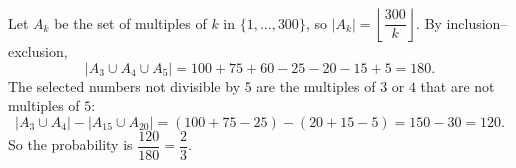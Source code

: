 Let $A_k$ be the set of multiples of $k$ in $\{1,\dots,300\}$, so $|A_k|=\left\lfloor\dfrac{300}{k}\right\rfloor$. By inclusion--exclusion,
\[
|A_3\cup A_4\cup A_5|=100+75+60-25-20-15+5=180 .
\]
The selected numbers not divisible by $5$ are the multiples of $3$ or $4$ that are not multiples of $5$:
\[
|A_3\cup A_4|-|A_{15}\cup A_{20}|=(100+75-25)-(20+15-5)=150-30=120 .
\]
So the probability is $\dfrac{120}{180}=\boxed{\dfrac{2}{3}}$.
